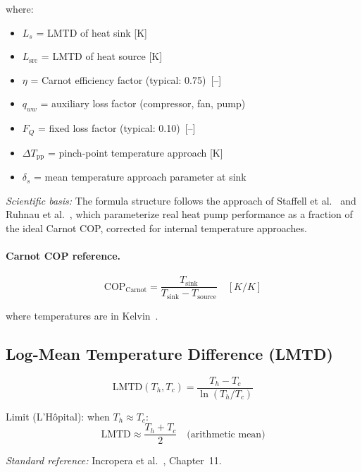\documentclass[a4paper,12pt]{article}
\newcommand{\COP}{\mathrm{COP}}
\newcommand{\LMTD}{\mathrm{LMTD}}
\begin{document}
\noindent where:
\begin{itemize}
  \item $L_s$ = LMTD of heat sink [K]
  \item $L_{\text{src}}$ = LMTD of heat source [K]
  \item $\eta$ = Carnot efficiency factor (typical: 0.75)~[--]
  \item $q_{ww}$ = auxiliary loss factor (compressor, fan, pump)
  \item $F_Q$ = fixed loss factor (typical: 0.10)~[--]
  \item $\Delta T_{\text{pp}}$ = pinch-point temperature approach [K]
  \item $\delta_s$ = mean temperature approach parameter at sink
\end{itemize}

\noindent\textit{Scientific basis:} The formula structure follows the approach of
Staffell et al.~\cite{Staffell2012} and Ruhnau et al.~\cite{Ruhnau2019}, which
parameterize real heat pump performance as a fraction of the ideal Carnot COP,
corrected for internal temperature approaches.

\paragraph{Carnot COP reference.}

\begin{equation}
  \COP_{\text{Carnot}}
  = \frac{T_{\text{sink}}}{T_{\text{sink}} - T_{\text{source}}}
  \quad [K/K]
  \label{eq:cop-carnot}
\end{equation}

where temperatures are in Kelvin~\cite{Cengel2018}.

\subsection{Log-Mean Temperature Difference (LMTD)}

\begin{equation}
  \LMTD(T_h, T_c)
  = \frac{T_h - T_c}{\ln(T_h / T_c)}
  \tag{COP-2}
  \label{eq:lmtd}
\end{equation}

\noindent Limit (L'H\^{o}pital): when $T_h \approx T_c$:
\[
  \LMTD \approx \frac{T_h + T_c}{2} \quad \text{(arithmetic mean)}
\]

\noindent\textit{Standard reference:} Incropera et al.~\cite{Incropera2017}, Chapter~11.
\end{document}
